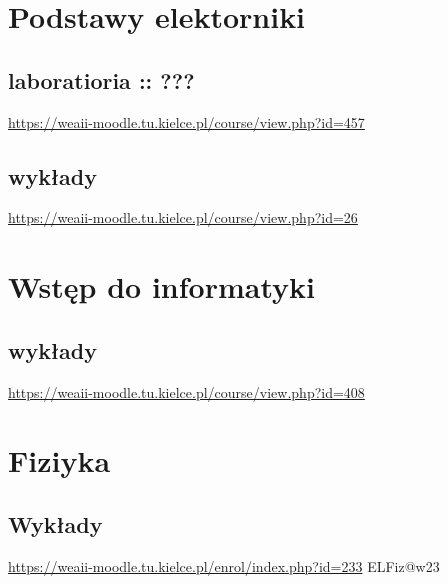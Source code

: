 \documentclass[11pt]{article}
\begin{document}
\section{Podstawy elektorniki}
\label{sec:org8dea86e}
\subsection{laboratioria :: ???}
\label{sec:orgf51f6d0}
\url{https://weaii-moodle.tu.kielce.pl/course/view.php?id=457}
\subsection{wykłady}
\label{sec:orgb64d409}
\url{https://weaii-moodle.tu.kielce.pl/course/view.php?id=26}
\section{Wstęp do informatyki}
\label{sec:orgccceb3a}
\subsection{wykłady}
\label{sec:orgb81f46a}
\url{https://weaii-moodle.tu.kielce.pl/course/view.php?id=408}
\section{Fiziyka}
\label{sec:orge53b5f9}
\subsection{Wykłady}
\label{sec:org837308a}
\url{https://weaii-moodle.tu.kielce.pl/enrol/index.php?id=233} ELFiz@w23
\end{document}

